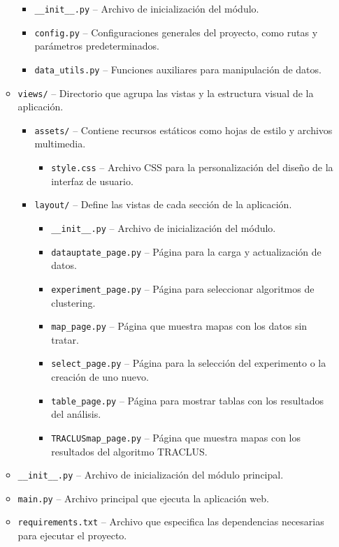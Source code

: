 \begin{itemize}
\begin{itemize}
        	\begin{itemize}
        		\item \texttt{\_\_init\_\_.py} -- Archivo de inicialización del módulo.
         	\item \texttt{config.py} -- Configuraciones generales del proyecto, como rutas y parámetros predeterminados.
        		\item \texttt{data\_utils.py} -- Funciones auxiliares para manipulación de datos.
        	\end{itemize}
        	\item \texttt{views/} -- Directorio que agrupa las vistas y la estructura visual de la aplicación.
 		\begin{itemize}
        		\item \texttt{assets/} -- Contiene recursos estáticos como hojas de estilo y archivos multimedia.
			\begin{itemize}
            		\item \texttt{style.css} -- Archivo CSS para la personalización del diseño de la interfaz de usuario.
            	\end{itemize}
			\item \texttt{layout/} -- Define las vistas de cada sección de la aplicación.
			\begin{itemize}
            		\item \texttt{\_\_init\_\_.py} -- Archivo de inicialización del módulo.
           		\item \texttt{datauptate\_page.py} -- Página para la carga y actualización de datos.
            		\item \texttt{experiment\_page.py} -- Página para seleccionar algoritmos de clustering.
            		\item \texttt{map\_page.py} -- Página que muestra mapas con los datos sin tratar.
            		\item \texttt{select\_page.py} -- Página para la selección del experimento o la creación de uno nuevo.
            		\item \texttt{table\_page.py} -- Página para mostrar tablas con los resultados del análisis.
				\item \texttt{TRACLUSmap\_page.py} -- Página que muestra mapas con los resultados del algoritmo TRACLUS.
			\end{itemize}
		\end{itemize}
		\item \texttt{\_\_init\_\_.py} -- Archivo de inicialización del módulo principal.
		\item \texttt{main.py} -- Archivo principal que ejecuta la aplicación web.
		\item \texttt{requirements.txt} -- Archivo que especifica las dependencias necesarias para ejecutar el proyecto.
    \end{itemize}
\end{itemize}

